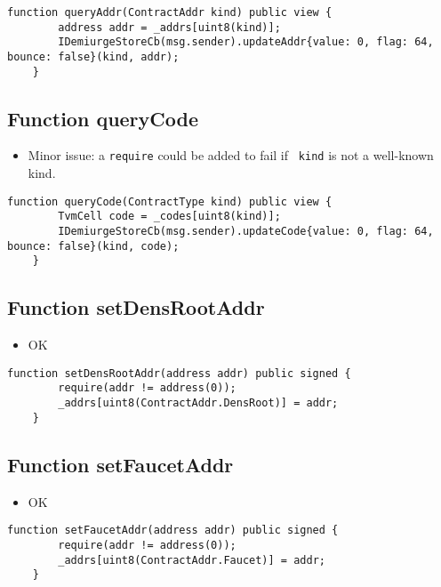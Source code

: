 \begin{lstlisting}[firstnumber=43]
    function queryAddr(ContractAddr kind) public view {
        address addr = _addrs[uint8(kind)];
        IDemiurgeStoreCb(msg.sender).updateAddr{value: 0, flag: 64, bounce: false}(kind, addr);
    }
\end{lstlisting}

\subsection{Function queryCode}

\begin{itemize}
\item Minor issue: a {\tt require} could be added to fail if {\tt
  kind} is not a well-known kind.
\end{itemize}

\begin{lstlisting}[firstnumber=38]
    function queryCode(ContractType kind) public view {
        TvmCell code = _codes[uint8(kind)];
        IDemiurgeStoreCb(msg.sender).updateCode{value: 0, flag: 64, bounce: false}(kind, code);
    }
\end{lstlisting}

\subsection{Function setDensRootAddr}

\begin{itemize}
\item OK
\end{itemize}

\begin{lstlisting}[firstnumber=21]
    function setDensRootAddr(address addr) public signed {
        require(addr != address(0));
        _addrs[uint8(ContractAddr.DensRoot)] = addr;
    }
\end{lstlisting}

\subsection{Function setFaucetAddr}

\begin{itemize}
\item OK
\end{itemize}

\begin{lstlisting}[firstnumber=29]
    function setFaucetAddr(address addr) public signed {
        require(addr != address(0));
        _addrs[uint8(ContractAddr.Faucet)] = addr;
    }
\end{lstlisting}

